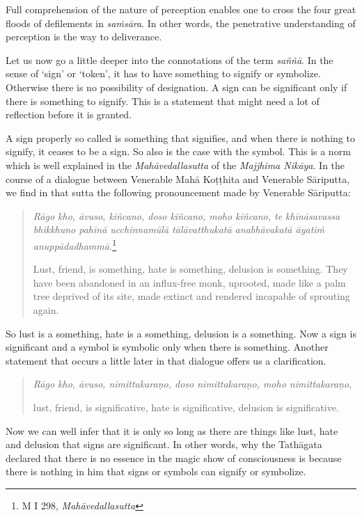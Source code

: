 Full comprehension of the nature of perception enables one to cross the four great floods of defilements in \emph{saṁsāra}. In other words, the penetrative understanding of perception is the way to deliverance.

Let us now go a little deeper into the connotations of the term \emph{saññā}. In the sense of `sign' or `token', it has to have something to signify or symbolize. Otherwise there is no possibility of designation. A sign can be significant only if there is something to signify. This is a statement that might need a lot of reflection before it is granted.

A sign properly so called is something that signifies, and when there is nothing to signify, it ceases to be a sign. So also is the case with the symbol. This is a norm which is well explained in the \emph{Mahāvedallasutta} of the \emph{Majjhima Nikāya}. In the course of a dialogue between Venerable Mahā Koṭṭhita and Venerable Sāriputta, we find in that sutta the following pronouncement made by Venerable Sāriputta:

\begin{quote}
\emph{Rāgo kho, āvuso, kiñcano, doso kiñcano, moho kiñcano, te khīnāsavassa bhikkhuno pahīnā ucchinnamūlā tālāvatthukatā anabhāvakatā āyatiṁ anuppādadhammā.}\footnote{M I 298, \emph{Mahāvedallasutta}}

Lust, friend, is something, hate is something, delusion is something. They have been abandoned in an influx-free monk, uprooted, made like a palm tree deprived of its site, made extinct and rendered incapable of sprouting again.
\end{quote}

So lust is a something, hate is a something, delusion is a something. Now a sign is significant and a symbol is symbolic only when there is something. Another statement that occurs a little later in that dialogue offers us a clarification.

\begin{quote}
\emph{Rāgo kho, āvuso, nimittakaraṇo, doso nimittakaraṇo, moho nimittakaraṇo},

lust, friend, is significative, hate is significative, delusion is significative.
\end{quote}

Now we can well infer that it is only so long as there are things like lust, hate and delusion that signs are significant. In other words, why the Tathāgata declared that there is no essence in the magic show of consciousness is because there is nothing in him that signs or symbols can signify or symbolize.

